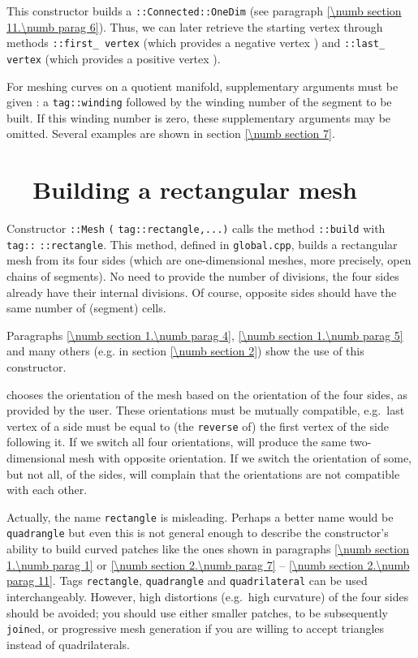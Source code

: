 This constructor builds a {\small\tt{}::Connected::OneDim}
(see paragraph \ref{\numb section 11.\numb parag 6}).
Thus, we can later retrieve the starting vertex through methods
{\small\tt{}::first\_\,vertex} (which provides a negative vertex {\small\tt{}})
and {\small\tt{}::last\_\,vertex} (which provides a positive vertex {\small\tt{}}).

For meshing curves on a quotient manifold, supplementary arguments must be given :
a {\small\tt\textcolor{tag}{tag}::winding} followed by the winding number of the segment
to be built.
If this winding number is zero, these supplementary arguments may be omitted.
Several examples are shown in section \ref{\numb section 7}.

\section{~~Building a rectangular mesh}\label{\numb section 12.\numb parag 3}

Constructor {\small\tt {}::Mesh} {\small\tt(}
{\small\tt\textcolor{tag}{tag}::rectangle,...)} calls the method {\small\tt{}::build}
with {\small\tt \textcolor{tag}{tag}::} {\small\tt::rectangle}.
This method, defined in {\small\tt global.cpp}, builds a rectangular mesh from its
four sides (which are one-dimensional meshes, more precisely, open chains of segments).
No need to provide the number of divisions, the four sides already have their internal divisions.
Of course, opposite sides should have the same number of (segment) cells.

Paragraphs \ref{\numb section 1.\numb parag 4}, \ref{\numb section 1.\numb parag 5} and
many others (e.g. in section \ref{\numb section 2}) show the use of this constructor.

{\ManiFEM} chooses the orientation of the mesh based on the orientation of the four sides,
as provided by the user.
These orientations must be mutually compatible, e.g.\ last vertex of a side must be equal to
(the {\small\tt reverse} of) the first vertex of the side following it.
If we switch all four orientations, {\maniFEM} will produce the same two-dimensional mesh
with opposite orientation.
If we switch the orientation of some, but not all, of the sides, {\maniFEM} will complain
that the orientations are not compatible with each other.

Actually, the name {\small\tt rectangle} is misleading.
Perhaps a better name would be {\small\tt quadrangle} but even this is not general enough to
describe the constructor's ability to build curved patches like the ones shown in paragraphs
\ref{\numb section 1.\numb parag 1} or \ref{\numb section 2.\numb parag 7} --
\ref{\numb section 2.\numb parag 11}.
Tags {\small\tt rectangle}, {\small\tt quadrangle} and {\small\tt quadrilateral} can be used
interchangeably.
However, high distortions (e.g.\ high curvature) of the four sides should be avoided;
you should use either smaller patches, to be subsequently {\small\tt join}ed,
or progressive mesh generation if you are willing to accept triangles instead of quadrilaterals.

